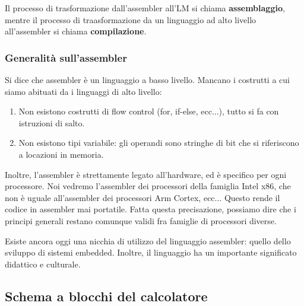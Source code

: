 \documentclass[a4paper,11pt]{article}
\begin{document}
Il processo di trasformazione dall'assembler all'LM si chiama \textbf{assemblaggio}, mentre il processo di traasformazione da un linguaggio ad alto livello all'assembler si chiama \textbf{compilazione}.

\subsubsection{Generalità sull'assembler}
Si dice che assembler è un linguaggio a basso livello.
Mancano i costrutti a cui siamo abituati da i linguaggi di alto livello:
\begin{enumerate}
	\item Non esistono costrutti di flow control (for, if-else, ecc...), tutto si fa con istruzioni di salto.
	\item Non esistono tipi variabile: gli operandi sono stringhe di bit che si riferiscono a locazioni in memoria.
\end{enumerate}

Inoltre, l'assembler è strettamente legato all'hardware, ed è specifico per ogni processore.
Noi vedremo l'assembler dei processori della famiglia Intel x86, che non è uguale all'assembler dei processori Arm Cortex, ecc...
Questo rende il codice in assembler mai portatile.
Fatta questa precisazione, possiamo dire che i principi generali restano comunque validi fra famiglie di processori diverse.

Esiste ancora oggi una nicchia di utilizzo del linguaggio assembler: quello dello sviluppo di sistemi embedded.
Inoltre, il linguaggio ha un importante significato didattico e culturale.

\subsection{Schema a blocchi del calcolatore}
\end{document}
